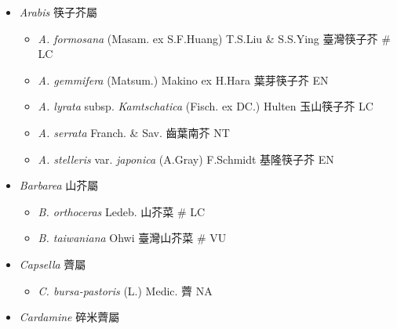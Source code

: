 
  \begin{itemize}
 \item[] \textit{Arabis} 筷子芥屬
                                
  \begin{itemize}
        \item[] \textit{A. formosana} (Masam. ex S.F.Huang) T.S.Liu \& S.S.Ying  臺灣筷子芥  \# LC
        \item[] \textit{A. gemmifera} (Matsum.) Makino ex H.Hara  葉芽筷子芥   EN
        \item[] \textit{A. lyrata} subsp. \textit{Kamtschatica} (Fisch. ex DC.) Hulten  玉山筷子芥   LC
        \item[] \textit{A. serrata} Franch. \& Sav.  齒葉南芥   NT
        \item[] \textit{A. stelleris} var. \textit{japonica} (A.Gray) F.Schmidt  基隆筷子芥   EN
  \end{itemize}
 \item[] \textit{Barbarea} 山芥屬
                                
  \begin{itemize}
        \item[] \textit{B. orthoceras} Ledeb.  山芥菜  \# LC
        \item[] \textit{B. taiwaniana} Ohwi  臺灣山芥菜  \# VU
  \end{itemize}
 \item[] \textit{Capsella} 薺屬
                                
  \begin{itemize}
        \item[] \textit{C. bursa-pastoris} (L.) Medic.  薺   NA
  \end{itemize}
 \item[] \textit{Cardamine} 碎米薺屬
                                

\end{itemize}
